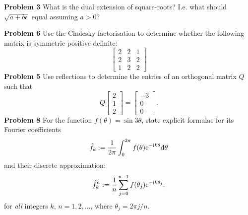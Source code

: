 \documentclass[12pt,a4paper]{article}
\begin{document}
\textbf{Problem 3} What is the dual extension of square-roots? I.e. what should $\sqrt{a + b \ensuremath{\epsilon}}$ equal assuming $a > 0$?

\textbf{Problem 6} Use the Cholesky factorisation to determine whether the following matrix is symmetric positive definite:
\[
\begin{bmatrix} 2 & 2 & 1  \\
2 & 3 & 2\\
1 & 2 & 2
\end{bmatrix}
\]
\textbf{Problem 5} Use reflections to determine the entries of an orthogonal matrix $Q$ such that
\[
Q \begin{bmatrix} 2 \\ 1 \\ 2 \end{bmatrix} =  \begin{bmatrix} -3 \\ 0 \\ 0 \end{bmatrix}.
\]
\textbf{Problem 8} For the function $f(\ensuremath{\theta}) = \sin 3 \ensuremath{\theta}$, state explicit formulae for its Fourier coefficients
\[
\hat f_k := {1 \over 2\ensuremath{\pi}} \int_0^{2\ensuremath{\pi}} f(\ensuremath{\theta}) {\rm e}^{-{\rm i} k \ensuremath{\theta}} {\rm d}\ensuremath{\theta}
\]
and  their discrete approximation:
\[
\hat f_k^n := {1 \over n} \sum_{j=0}^{n-1} f(\ensuremath{\theta}_j) {\rm e}^{-{\rm i} k \ensuremath{\theta}_j}.
\]
for \emph{all} integers $k$, $n = 1,2,\ensuremath{\ldots}$, where $\ensuremath{\theta}_j = 2\ensuremath{\pi} j/n$.
\end{document}
